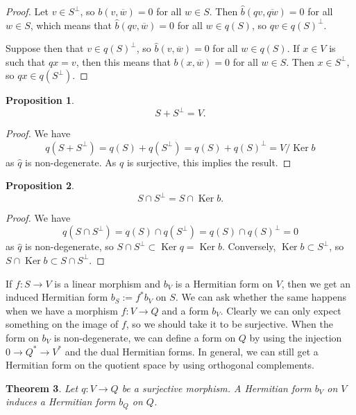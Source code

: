 \documentclass[10pt,a4paper]{article}
\newtheorem{theo}{Theorem}[section]
\newtheorem{prop}[theo]{Proposition}
\newtheorem*{proof}{Proof}
\def\ov#1{\overline{#1}}
\DeclareMathOperator{\Ker}{Ker}
\begin{document}
\begin{proof}
Let $v \in S^\perp$, so $b(v, \ov w) = 0$ for all $w \in S$. Then $\hat b(qv, \ov{qw}) = 0$ for all $w \in S$, which means that $\hat b(qv, \ov w) = 0$ for all $w \in q(S)$, so $qv \in q(S)^\perp$.

Suppose then that $v \in q(S)^\perp$, so $\hat b(v, \ov w) = 0$ for all $w \in q(S)$. If $x \in V$ is such that $qx = v$, then this means that $b(x, \ov w) = 0$ for all $w \in S$. Then $x \in S^\perp$, so $qx \in q(S^\perp)$.
\end{proof}



\begin{prop}
\[
S + S^\perp = V.
\]
\end{prop}

\begin{proof}
We have
\[
q(S + S^\perp)
= q(S) + q(S^\perp)
= q(S) + q(S)^\perp
= V / \Ker b
\]
as $\hat q$ is non-degenerate. As $q$ is surjective, this implies the result.
\end{proof}




\begin{prop}
\[
S \cap S^\perp = S \cap \Ker b.
\]
\end{prop}

\begin{proof}
We have
\[
q(S \cap S^\perp)
= q(S) \cap q(S^\perp)
= q(S) \cap q(S)^\perp
= 0
\]
as $\hat q$ is non-degenerate,
so $S \cap S^\perp \subset \Ker q = \Ker b$. Conversely, $\Ker b \subset S^\perp$, so $S \cap \Ker b \subset S \cap S^\perp$.
\end{proof}


If $f : S \to V$ is a linear morphism and $b_V$ is a Hermitian form on $V$, then we get an induced Hermitian form $b_S := f^*b_V$ on $S$. We can ask whether the same happens when we have a morphism $f : V \to Q$ and a form $b_V$. Clearly we can only expect something on the image of $f$, so we should take it to be surjective. When the form on $b_V$ is non-degenerate, we can define a form on $Q$ by using the injection $0 \to Q^* \to V^*$ and the dual Hermitian forms. In general, we can still get a Hermitian form on the quotient space by using orthogonal complements.


\begin{theo}
Let $q : V \to Q$ be a surjective morphism. A Hermitian form $b_V$ on $V$ induces a Hermitian form $b_Q$ on $Q$.
\end{theo}
\end{document}
